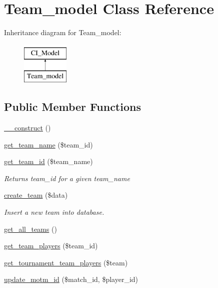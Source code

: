 \hypertarget{class_team__model}{}\section{Team\+\_\+model Class Reference}
\label{class_team__model}
Inheritance diagram for Team\+\_\+model\+:\begin{figure}[H]
\begin{center}
\leavevmode
\includegraphics[height=2.000000cm]{class_team__model}
\end{center}
\end{figure}
\subsection*{Public Member Functions}
\begin{DoxyCompactItemize}
\item 
\hyperlink{class_team__model_a095c5d389db211932136b53f25f39685}{\+\_\+\+\_\+construct} ()
\item 
\hyperlink{class_team__model_a2138279ea2e6b6ab7819f799e55be0b1}{get\+\_\+team\+\_\+name} (\$team\+\_\+id)
\item 
\hyperlink{class_team__model_af4e80eb207d15ec28c6b1872b0c827b4}{get\+\_\+team\+\_\+id} (\$team\+\_\+name)
\begin{DoxyCompactList}\small\item\em Returns {\ttfamily team\+\_\+id} for a given {\ttfamily team\+\_\+name} \end{DoxyCompactList}\item 
\hyperlink{class_team__model_aea579a50bcf1891d5521dfe359986520}{create\+\_\+team} (\$data)
\begin{DoxyCompactList}\small\item\em Insert a new team into database. \end{DoxyCompactList}\item 
\hyperlink{class_team__model_a762b57e56b4ea13efa861ca9d15c13ec}{get\+\_\+all\+\_\+teams} ()
\item 
\hyperlink{class_team__model_a4f0532d5369dcb9ed895d7e081e0fae1}{get\+\_\+team\+\_\+players} (\$team\+\_\+id)
\item 
\hyperlink{class_team__model_a83d99271e04e61807320b5b9b7d12030}{get\+\_\+tournament\+\_\+team\+\_\+players} (\$team)
\item 
\hyperlink{class_team__model_a06064e208741b99d4c8f634bef3086b0}{update\+\_\+motm\+\_\+id} (\$match\+\_\+id, \$player\+\_\+id)
\end{DoxyCompactItemize}


